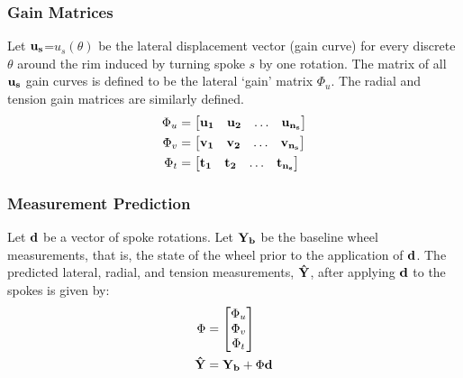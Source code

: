 \documentclass[mathserif]{beamer}
\begin{document}
\begin{frame}
\frametitle{Gain Matrices}
Let $\bf{u_s}$=$u_s(\theta)$ be the lateral displacement vector (gain curve) for every discrete $\theta$ around the rim induced by turning spoke $s$ by one rotation.  The matrix of all $\bf u_s$ gain curves is defined to be the lateral `gain' matrix $\Phi_u$.  The radial and tension gain matrices are similarly defined.
\begin{align*}
     \Phi_u &= \begin{bmatrix}
     \bf u_1 & \bf u_2& \dots & \bf u_{n_s}
     \end{bmatrix}\\
     \Phi_v &= \begin{bmatrix}
     \bf v_1 & \bf v_2& \dots & \bf v_{n_s}
     \end{bmatrix}\\     
     \Phi_t &= \begin{bmatrix}
     \bf t_1 & \bf t_2& \dots & \bf t_{n_s}
     \end{bmatrix} 
\end{align*}
\end{frame}

\begin{frame}
\frametitle{Measurement Prediction}
Let $\bf d$ be a vector of spoke rotations. Let $\bf Y_b$ be the baseline wheel measurements, that is, the state of the wheel prior to the application of $\bf d$. The predicted lateral, radial, and tension measurements, $\bf \hat Y$, after applying $\bf d$ to the spokes is given by:
\begin{align*}
    \Phi &= \begin{bmatrix}
        \Phi_u\\
        \Phi_v\\
        \Phi_t
    \end{bmatrix}\\
   \bf \hat Y&= {\bf Y_b} + \Phi \bf d\\
\end{align*}
\end{frame}
\end{document}
